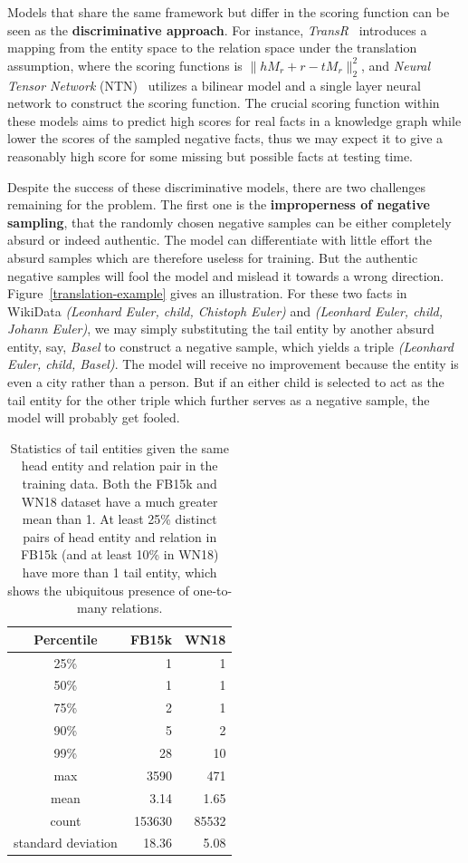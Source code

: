 \documentclass[twocolumn,a4paper,10pt,preprint,3p]{elsarticle}
\begin{document}
Models that share the same framework but differ in the scoring function can be seen as the \textbf{discriminative approach}. For instance, \emph{TransR}~\cite{TransR2015} introduces a mapping from the entity space to the relation space under the translation assumption, where the scoring functions is $\lVert h M_r + r - t M_r \rVert_2^2 $, and \emph{Neural Tensor Network} (NTN)~\cite{NTN} utilizes a bilinear model and a single layer neural network to construct the scoring function. The crucial scoring function within these models aims to predict high scores for real facts in a knowledge graph while lower the scores of the sampled negative facts, thus we may expect it to give a reasonably high score for some missing but possible facts at testing time.

Despite the success of these discriminative models, there are two challenges remaining for the problem.
The first one is the \textbf{improperness of negative sampling}, that the randomly chosen negative samples can be either completely absurd or indeed authentic.
The model can differentiate with little effort the absurd samples which are therefore useless for training. But the authentic negative samples will fool the model and mislead it towards a wrong direction. Figure~\ref{translation-example} gives an illustration. For these two facts in WikiData \emph{(Leonhard Euler, child, Chistoph Euler)} and \emph{(Leonhard Euler, child, Johann Euler)}, we may simply substituting the tail entity by another absurd entity, say, \emph{Basel} to construct a negative sample, which yields a triple \emph{(Leonhard Euler, child, Basel)}. The model will receive no improvement because the entity is even a city rather than a person. But if an either child is selected to act as the tail entity for the other triple which further serves as a negative sample, the model will probably get fooled.

\begin{table}
    \centering
    \begin{tabular}{c|r|r}
        \toprule
        Percentile & FB15k & WN18 \\
        \midrule
        25\% &  1   & 1  \\
        50\% &  1   & 1 \\
        75\% &  2   & 1 \\
        90\% &  5   & 2 \\
        99\% &  28  & 10 \\
        max & 3590  &  471 \\
        \midrule
        mean &  3.14 & 1.65 \\
        count & 153630 & 85532 \\
        standard deviation & 18.36 & 5.08 \\
        \bottomrule
    \end{tabular}
    \caption{Statistics of tail entities given the same head entity and relation pair in the training data. Both the FB15k and WN18 dataset have a much greater mean than 1. At least 25\% distinct pairs of head entity and relation in FB15k (and at least 10\% in WN18) have more than 1 tail entity, which shows the ubiquitous presence of one-to-many relations. }
\label{one-to-many}
\end{table}
\end{document}
